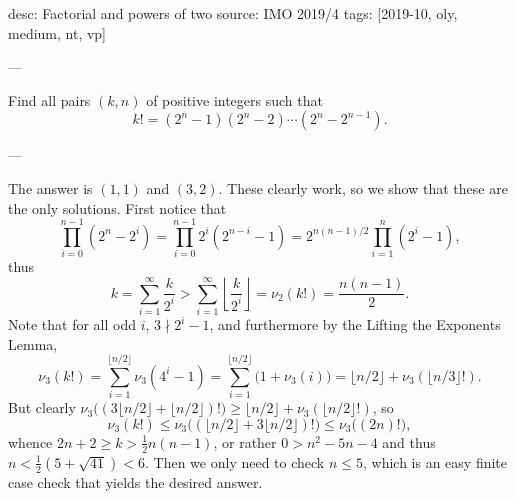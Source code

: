 desc: Factorial and powers of two
source: IMO 2019/4
tags: [2019-10, oly, medium, nt, vp]

---

Find all pairs $(k,n)$ of positive integers such that \[k!=(2^n-1)(2^n-2)\cdots(2^n-2^{n-1}).\]

---

The answer is $(1,1)$ and $(3,2)$. These clearly work, so we show that these are the only solutions. First notice that \[\prod_{i=0}^{n-1}\left(2^n-2^i\right)=\prod_{i=0}^{n-1}2^i\left(2^{n-i}-1\right)=2^{n(n-1)/2}\prod_{i=1}^n\left(2^i-1\right),\]
thus \[k=\sum_{i=1}^\infty\frac k{2^i}>\sum_{i=1}^\infty\left\lfloor\frac k{2^i}\right\rfloor=\nu_2(k!)=\frac{n(n-1)}2.\]
Note that for all odd $i$, $3\nmid2^i-1$, and furthermore by the Lifting the Exponents Lemma, \[\nu_3(k!)=\sum_{i=1}^{\lfloor n/2\rfloor}\nu_3\left(4^i-1\right)=\sum_{i=1}^{\lfloor n/2\rfloor}\Big(1+\nu_3(i)\Big)=\lfloor n/2\rfloor+\nu_3\left(\lfloor n/3\rfloor!\right).\]
But clearly $\nu_3\big((3\lfloor n/2\rfloor+\lfloor n/2\rfloor)!\big)\ge\lfloor n/2\rfloor+\nu_3(\lfloor n/2\rfloor!)$, so \[\nu_3(k!)\le\nu_3\big((\lfloor n/2\rfloor+3\lfloor n/2\rfloor)!\big)\le\nu_3\big((2n)!\big),\]
whence $2n+2\ge k>\tfrac12n(n-1)$, or rather $0>n^2-5n-4$ and thus $n<\tfrac12(5+\sqrt{41})<6$. Then we only need to check $n\le5$, which is an easy finite case check that yields the desired answer.
